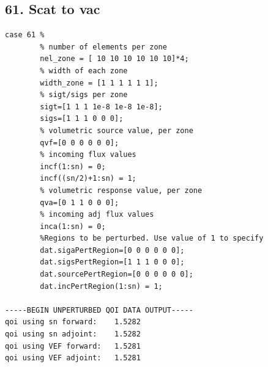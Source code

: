 \documentclass{article}
\begin{document}
\subsection{61. Scat to vac}
\begin{verbatim}
case 61 %
        % number of elements per zone
        nel_zone = [ 10 10 10 10 10 10]*4;
        % width of each zone
        width_zone = [1 1 1 1 1 1];
        % sigt/sigs per zone
        sigt=[1 1 1 1e-8 1e-8 1e-8];
        sigs=[1 1 1 0 0 0];
        % volumetric source value, per zone
        qvf=[0 0 0 0 0 0];
        % incoming flux values
        incf(1:sn) = 0;
        incf((sn/2)+1:sn) = 1;
        % volumetric response value, per zone
        qva=[0 1 1 0 0 0];
        % incoming adj flux values
        inca(1:sn) = 0;
        %Regions to be perturbed. Use value of 1 to specify
        dat.sigaPertRegion=[0 0 0 0 0 0];
        dat.sigsPertRegion=[1 1 1 0 0 0];
        dat.sourcePertRegion=[0 0 0 0 0 0];
        dat.incPertRegion(1:sn) = 1;
        
-----BEGIN UNPERTURBED QOI DATA OUTPUT----- 
qoi using sn forward: 	 1.5282 
qoi using sn adjoint: 	 1.5282 
qoi using VEF forward: 	 1.5281 
qoi using VEF adjoint: 	 1.5281 
\end{verbatim}
\end{document}
